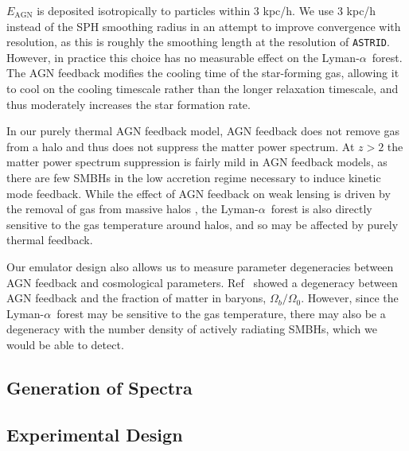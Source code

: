 \documentclass[a4paper,11pt]{article}
\newcommand{\Lya}{Lyman-$\alpha$}
\newcommand{\astrid}{\texttt{ASTRID}}
\begin{document}
$E_\mathrm{AGN}$ is deposited isotropically to particles within $3$ kpc/h. We use $3$ kpc/h instead of the SPH smoothing radius in an attempt to improve convergence with resolution, as this is roughly the smoothing length at the resolution of \astrid. However, in practice this choice has no measurable effect on the \Lya~forest. The AGN feedback modifies the cooling time of the star-forming gas, allowing it to cool on the cooling timescale rather than the longer relaxation timescale, and thus moderately increases the star formation rate.

In our purely thermal AGN feedback model, AGN feedback does not remove gas from a halo and thus does not suppress the matter power spectrum. At $z > 2$ the matter power spectrum suppression is fairly mild in AGN feedback models, as there are few SMBHs in the low accretion regime necessary to induce kinetic mode feedback. While the effect of AGN feedback on weak lensing is driven by the removal of gas from massive halos \cite[e.g.~][]{Giri:2021}, the \Lya~forest is also directly sensitive to the gas temperature around halos, and so may be affected by purely thermal feedback.

Our emulator design also allows us to measure parameter degeneracies between AGN feedback and cosmological parameters. Ref~\cite{Schneider:2015} showed a degeneracy between AGN feedback and the fraction of matter in baryons, $\Omega_b / \Omega_0$. However, since the \Lya~forest may be sensitive to the gas temperature, there may also be a degeneracy with the number density of actively radiating SMBHs, which we would be able to detect.


\subsection{Generation of Spectra}
\label{sec:spectra}

\subsection{Experimental Design}
\label{sec:latinhypercube}

\end{document}
